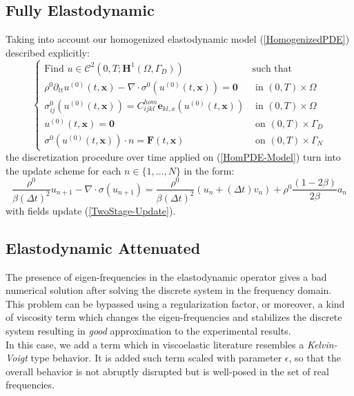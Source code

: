 \subsection{Fully Elastodynamic}

Taking into account our homogenized elastodynamic model (\ref{HomogenizedPDE}) described explicitly:
\begin{equation}
    \label{HomPDE-Model}
    \left \{
    \begin{array}{cc}
        \text{Find $u \in \mathcal{C}^2(0,T;\mathbf{H}^1(\Omega, \Gamma_D))$} & \text{such that} \\
        \rho^{0} \partial_{tt} u^{(0)}(t,\mathbf{x}) - \nabla \cdot \sigma^{0} (u^{(0)}(t,\mathbf{x}) ) = \mathbf{0} & \text{ in } (0,T)\times \Omega \\
        \sigma^{0}_{ij}(u^{(0)}(t, \mathbf{x})) = C^{hom}_{ijkl}\mathbf{e}_{kl,x}(u^{(0)}(t,\mathbf{x})) & \text{ in } (0,T)\times \Omega \\
        u^{(0)}(t, \mathbf{x}) = \mathbf{0} & \text{ on } (0,T)\times \Gamma_D \\
        \sigma^{0}(u^{(0)}(t, \mathbf{x})) \cdot n = \mathbf{F}(t, \mathbf{x}) & \text{ on } (0,T)\times \Gamma_N
    \end{array}
    \right .
\end{equation}
the discretization procedure over time applied on (\ref{HomPDE-Model}) turn into the update scheme for each $n \in \{1,\dots, N\}$ in the form:
\begin{equation*}
    \label{HomPDE-TimeUpdate}
    \frac{\rho^{0}}{\beta (\Delta t)^2} u_{n+1} - \nabla \cdot \sigma(u_{n+1}) = \frac{\rho^{0}}{\beta (\Delta t)^2} ( u_{n} + (\Delta t) v_n ) + \rho^{0}\frac{(1-2\beta)}{2\beta} a_n
\end{equation*}
with fields update (\ref{TwoStage-Update}).

\subsection{Elastodynamic Attenuated}
The presence of eigen-frequencies in the elastodynamic operator gives a bad numerical solution after solving the discrete system in the frequency domain. This problem can be bypassed using a regularization factor, or moreover, a kind of viscosity term which changes the eigen-frequencies and stabilizes the discrete system resulting in \textit{good} approximation to the experimental results.\\
In this case, we add a term which in viscoelastic literature resembles a \textit{Kelvin-Voigt} type behavior. It is added such term scaled with parameter $\epsilon$, so that the overall behavior is not abruptly disrupted but is well-posed in the set of real frequencies.

